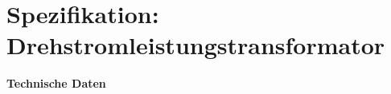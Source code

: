 \section{Spezifikation: Drehstromleistungstransformator}

\textbf{Technische Daten}
\begin{table}
    
\end{table}